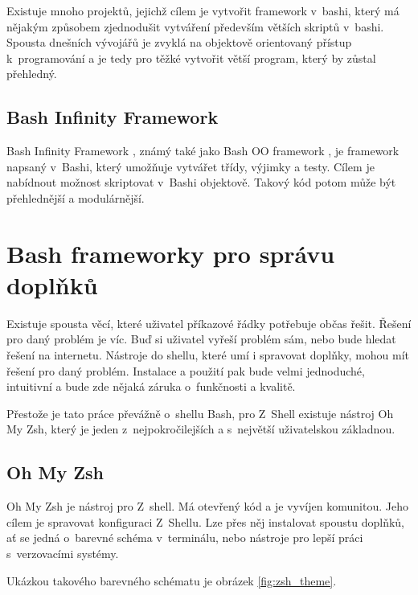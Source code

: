 \documentclass[thesis=M,czech]{FITthesis}[2012/06/26]
\begin{document}
Existuje mnoho projektů, jejichž cílem je vytvořit framework v~bashi, který má nějakým způsobem zjednodušit vytváření především větších skriptů v~bashi. Spousta dnešních vývojářů je zvyklá na objektově orientovaný přístup k~programování a je tedy pro těžké vytvořit větší program, který by zůstal přehledný.

\subsection{Bash Infinity Framework}
Bash Infinity Framework \cite{bashinfinity}, známý také jako Bash OO framework \cite{bashooframework}, je framework napsaný v~Bashi, který umožňuje vytvářet třídy, výjimky a testy. Cílem je nabídnout možnost skriptovat v~Bashi objektově. Takový kód potom může být přehlednější a modulárnější.

%
%
%
%
%

\section{Bash frameworky pro správu doplňků}

Existuje spousta věcí, které uživatel příkazové řádky potřebuje občas řešit. Řešení pro daný problém je víc. Buď si uživatel vyřeší problém sám, nebo bude hledat řešení na internetu. Nástroje do shellu, které umí i spravovat doplňky, mohou mít řešení pro daný problém. Instalace a použití pak bude velmi jednoduché, intuitivní a bude zde nějaká záruka o~funkčnosti a kvalitě.

Přestože je tato práce převážně o~shellu Bash, pro Z~Shell existuje nástroj Oh My Zsh, který je jeden z~nejpokročilejších a s~největší uživatelskou základnou.

%
%
%
\subsection{Oh My Zsh}

Oh My Zsh \cite{ohmyzsh} je nástroj pro Z~shell. Má otevřený kód a je vyvíjen komunitou. Jeho cílem je spravovat konfiguraci Z~Shellu. Lze přes něj instalovat spoustu doplňků, ať se jedná o~barevné schéma v~terminálu, nebo nástroje pro lepší práci s~verzovacími systémy.

Ukázkou takového barevného schématu je obrázek \ref{fig:zsh_theme}.
\end{document}

